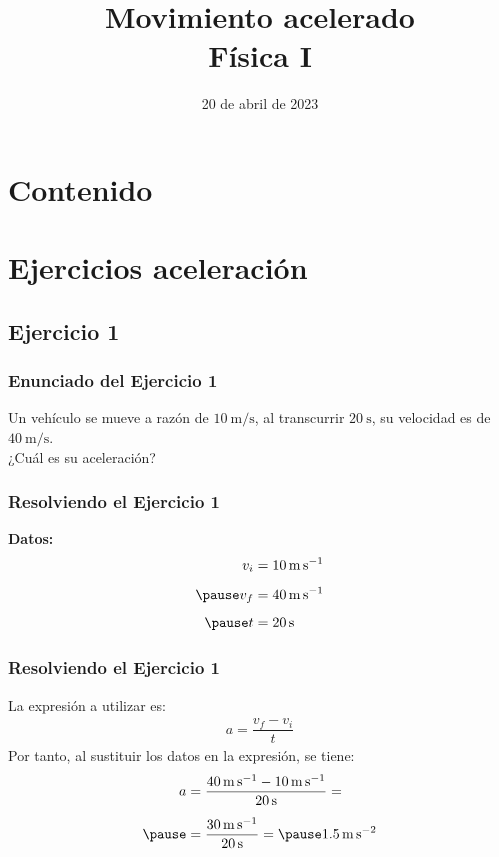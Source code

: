 \documentclass[14pt]{beamer}
\title{\Large{Movimiento acelerado} \\ \normalsize{Física I}}
\date{20 de abril de 2023}
\begin{document}
\maketitle

\section*{Contenido}

\section{Ejercicios aceleración}
\subsection{Ejercicio 1}

\begin{frame}
\frametitle{Enunciado del Ejercicio 1}
Un vehículo se mueve a razón de $\SI{10}{\meter\per\second}$, al transcurrir $\SI{20}{\second}$, su velocidad es de $\SI{40}{\meter\per\second}$.
\\
\bigskip
\pause
¿Cuál es su aceleración?
\end{frame}
\begin{frame}
\frametitle{Resolviendo el Ejercicio 1}
\textbf{Datos:}
\begin{eqnarray*}
\begin{aligned}
v_{i} &= \SI{10}{\meter\per\second} \\[0.5em] \pause
v_{f} &= \SI{40}{\meter\per\second} \\[0.5em] \pause
t &= \SI{20}{\second}
\end{aligned}
\end{eqnarray*}
\end{frame}
\begin{frame}
\frametitle{Resolviendo el Ejercicio 1}
La expresión a utilizar es:
\pause
\begin{align*}
a = \dfrac{v_{f} - v_{i}}{t}
\end{align*}
\pause
Por tanto, al sustituir los datos en la expresión, se tiene:
\pause
\begin{eqnarray*}
\begin{aligned}
a &= \dfrac{\SI{40}{\meter\per\second} - \SI{10}{\meter\per\second}}{\SI{20}{\second}} = \\[0.5em] \pause
&= \dfrac{\SI{30}{\meter\per\second}}{\SI{20}{\second}} = \pause \SI{1.5}{\meter\per\square\second}
\end{aligned}
\end{eqnarray*}
\end{frame}
\end{document}

